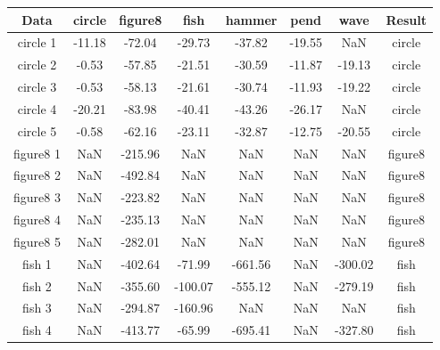 \documentclass[twoside]{article}
\begin{document}
\begin{multicols}{2}
\begin{thebibliography}{2}
%
%

\end{thebibliography}


\end{multicols}
\begin{table}[H]
\centering
\begin{tabular}{|c|c|c|c|c|c|c|c|}\hline
Data & circle & figure8 & fish & hammer & pend & wave & Result \\ \hline\hline
circle 1 & -11.18 & -72.04 & -29.73 & -37.82 & -19.55 & NaN    & circle \\
circle 2 & -0.53  & -57.85 & -21.51 & -30.59 & -11.87 & -19.13 & circle \\
circle 3 & -0.53  & -58.13 & -21.61 & -30.74 & -11.93 & -19.22 & circle \\
circle 4 & -20.21 & -83.98 & -40.41 & -43.26 & -26.17 & NaN    & circle \\
circle 5 & -0.58  & -62.16 & -23.11 & -32.87 & -12.75 & -20.55 & circle \\ \hline \hline
figure8 1 & NaN & -215.96 & NaN & NaN & NaN & NaN & figure8 \\
figure8 2 & NaN & -492.84 & NaN & NaN & NaN & NaN & figure8 \\
figure8 3 & NaN & -223.82 & NaN & NaN & NaN & NaN & figure8 \\
figure8 4 & NaN & -235.13 & NaN & NaN & NaN & NaN & figure8 \\
figure8 5 & NaN & -282.01 & NaN & NaN & NaN & NaN & figure8 \\ \hline\hline
fish 1 & NaN & -402.64 &  -71.99 & -661.56 & NaN & -300.02 & fish \\
fish 2 & NaN & -355.60 & -100.07 & -555.12 & NaN & -279.19 & fish \\
fish 3 & NaN & -294.87 & -160.96 &     NaN & NaN &     NaN & fish \\
fish 4 & NaN & -413.77 &  -65.99 & -695.41 & NaN & -327.80 & fish \\

\end{tabular}
\end{table}
\end{document}
